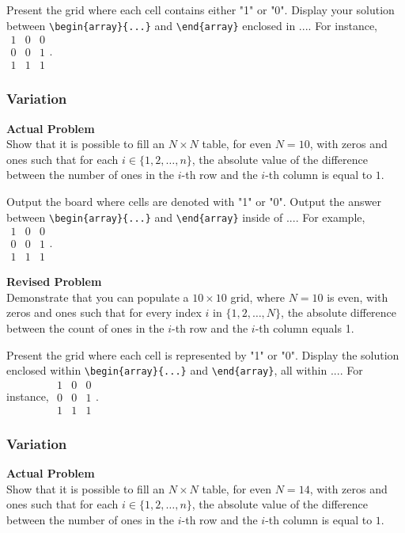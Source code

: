 Present the grid where each cell contains either "1" or "0". Display your solution between \verb|\begin{array}{...}| and \verb|\end{array}| enclosed in $\boxed{...}$. For instance, $\boxed{\begin{array}{ccc}1 & 0 & 0 \\ 0 & 0 & 1 \\ 1 & 1 & 1\end{array}}$.

\subsubsection{Variation}
\textbf{Actual Problem}\\
Show that it is possible to fill an $N \times N$ table, for even $N=10$, with zeros and ones such that for each $i \in\{1,2, \ldots, n\}$, the absolute value of the difference between the number of ones in the $i$-th row and the $i$-th column is equal to $1$.

Output the board where cells are denoted with "1" or "0". Output the answer between \verb|\begin{array}{...}| and \verb|\end{array}| inside of $\boxed{...}$. For example, $\boxed{\begin{array}{ccc}1 & 0 & 0 \\ 0 & 0 & 1 \\ 1 & 1 & 1\end{array}}$.

\textbf{Revised Problem}\\
Demonstrate that you can populate a $10 \times 10$ grid, where $N = 10$ is even, with zeros and ones such that for every index $i$ in $\{1, 2, \ldots, N\}$, the absolute difference between the count of ones in the $i$-th row and the $i$-th column equals 1.

Present the grid where each cell is represented by "1" or "0". Display the solution enclosed within \verb|\begin{array}{...}| and \verb|\end{array}|, all within $\boxed{...}$. For instance, $\boxed{\begin{array}{ccc}1 & 0 & 0 \\ 0 & 0 & 1 \\ 1 & 1 & 1\end{array}}$.

\subsubsection{Variation}
\textbf{Actual Problem}\\
Show that it is possible to fill an $N \times N$ table, for even $N=14$, with zeros and ones such that for each $i \in\{1,2, \ldots, n\}$, the absolute value of the difference between the number of ones in the $i$-th row and the $i$-th column is equal to $1$.

